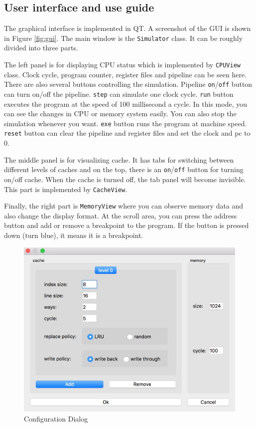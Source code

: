 \documentclass{sig-alternate}
\begin{document}
\subsection{User interface and use guide}
The graphical interface is implemented in QT. A screenshot of the GUI is shown in Figure \ref{fig:gui}. The main window is the \texttt{Simulator} class. It can be roughly divided into three parts. 

The left panel is for displaying CPU status which is implemented by \texttt{CPUView} class. Clock cycle, program counter, register files and pipeline can be seen here. There are also several buttons controlling the simulation. Pipeline \texttt{on}/\texttt{off} button can turn on/off the pipeline. \texttt{step} can simulate one clock cycle. \texttt{run} button executes the program at the speed of 100 millisecond a cycle. In this mode, you can see the changes in CPU or memory system easily. You can also stop the simulation whenever you want. \texttt{exe} button runs the program at machine speed. \texttt{reset} button can clear the pipeline and register files and set the clock and pc to 0. 

The middle panel is for visualizing cache. It has tabs for switching between different levels of caches and on the top, there is an \texttt{on}/\texttt{off} button for turning on/off cache. When the cache is turned off, the tab panel will become invisible. This part is implemented by \texttt{CacheView}. 

Finally, the right part is \texttt{MemoryView} where you can observe memory data and also change the display format. At the scroll area, you can press the address button and add or remove a breakpoint to the program. If the button is pressed down (turn blue), it means it is a breakpoint. 
\begin{figure}[!ht]
\centering
\includegraphics[width = 0.8\linewidth,keepaspectratio]{config}
\caption{Configuration Dialog}
\label{fig:conf}
\end{figure}
\end{document}
